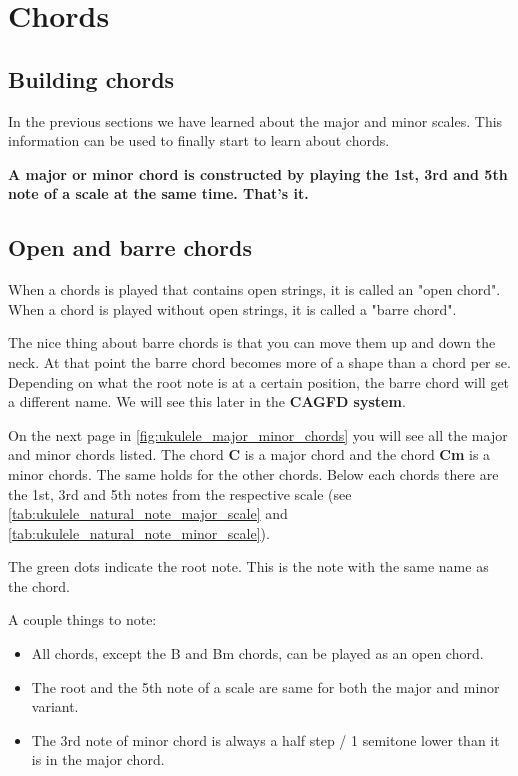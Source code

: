 \section{Chords}

\subsection{Building chords}
In the previous sections we have learned about the major and minor scales. This information can be used to finally start to learn about chords.

\textbf{A major or minor chord is constructed by playing the 1st, 3rd and 5th note of a scale at the same time. That's it.}

\subsection{Open and barre chords}

When a chords is played that contains open strings, it is called an "open chord". When a chord is played without open strings, it is called a "barre chord".

The nice thing about barre chords is that you can move them up and down the neck. At that point the barre chord becomes more of a shape than a chord per se. Depending on what the root note is at a certain position, the barre chord will get a different name. We will see this later in the \textbf{CAGFD system}.

On the next page in \autoref{fig:ukulele_major_minor_chords} you will see all the major and minor chords listed. The chord \textbf{C} is a major chord and the chord \textbf{Cm} is a minor chords. The same holds for the other chords. Below each chords there are the 1st, 3rd and 5th notes from the respective scale (see \autoref{tab:ukulele_natural_note_major_scale} and \autoref{tab:ukulele_natural_note_minor_scale}).

The green dots indicate the root note. This is the note with the same name as the chord.

A couple things to note:

\begin{itemize}
	\item All chords, except the B and Bm chords, can be played as an open chord.
	\item The root and the 5th note of a scale are same for both the major and minor variant.
	\item The 3rd note of minor chord is always a half step / 1 semitone lower than it is in the major chord.
\end{itemize}


